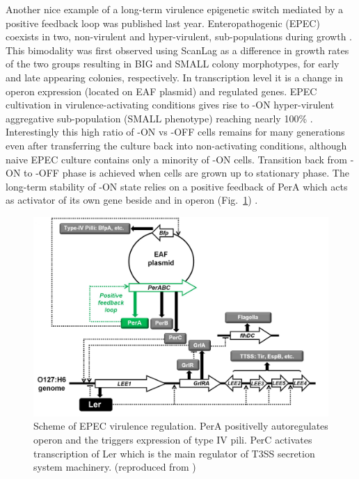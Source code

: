 Another nice example of a long-term virulence epigenetic switch mediated by a positive feedback loop was published last year.
Enteropathogenic  (EPEC) coexists in two, non-virulent and hyper-virulent, sub-populations during growth \cite{ronin2017long}.
This bimodality was first observed  using ScanLag \cite{levin2014scanlag} as a difference in growth rates of the two groups resulting in BIG and SMALL colony morphotypes, for early and late appearing colonies, respectively.
In transcription level it is a change in  operon expression (located on EAF plasmid) and  regulated genes.
EPEC cultivation in virulence-activating conditions gives rise to -ON hyper-virulent aggregative sub-population (SMALL phenotype) reaching nearly 100\% \cite{ronin2017long}.
Interestingly this high ratio of -ON vs -OFF cells remains for many generations even after transferring the culture back into non-activating conditions, although naive EPEC culture contains only a minority of -ON cells.
Transition back from -ON to -OFF phase is achieved when cells are grown up to stationary phase.
The long-term stability of -ON state relies on a positive feedback of PerA which acts as activator of its own gene beside  and  in  operon (Fig.~\ref{per}) \cite{ibarra2003identification, ronin2017long}.
\begin{figure}[h!]
  \centering
  \includegraphics[scale=0.2]{text/Pictures/perOperonRegulation.jpg}
	\caption{Scheme of EPEC virulence regulation. PerA positivelly autoregulates  operon and the triggers expression of type IV pili. PerC activates transcription of Ler which is the main regulator of T3SS secretion system machinery. (reproduced from \cite{ronin2017long})}
	\label{per}
\end{figure}



\cleardoublepage

